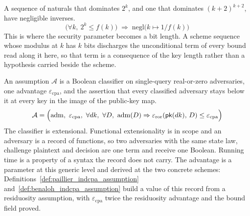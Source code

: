 \begin{lemma}
  \label{lem:negligible_fun_inv_exp2}
  \rocqok
  A sequence of naturals that dominates $2^k$, and one that dominates
  $(k+2)^{k+2}$, have negligible inverses.
  \[ \big(\forall k,\ 2^k \le f(k)\big) \;\Longrightarrow\;
     \mathrm{negl}\big(k \mapsto 1/f(k)\big) \]
  This is where the security parameter becomes a bit length. A scheme sequence
  whose modulus at $k$ has $k$ bits discharges the unconditional term of every
  bound read along it here, so that term is a consequence of the key length
  rather than a hypothesis carried beside the scheme.
\end{lemma}

\begin{definition}
  \label{def:indcpa_assumption}
  \rocqok
  An assumption $\mathcal{A}$ is a Boolean classifier on single-query
  real-or-zero adversaries, one advantage $\varepsilon_{\mathrm{cpa}}$, and the
  assertion that every classified adversary stays below it at every key in the
  image of the public-key map.
  \[ \mathcal{A} = \Big(\mathrm{adm},\ \varepsilon_{\mathrm{cpa}},\
       \forall dk,\ \forall D,\ \mathrm{adm}(D) \Rightarrow
       \epsror{\pk(dk)}{D} \le \varepsilon_{\mathrm{cpa}}\Big) \]
  The classifier is extensional. Functional extensionality is in scope and an
  adversary is a record of functions, so two adversaries with the same state
  law, challenge plaintext and decision are one term and receive one Boolean.
  Running time is a property of a syntax the record does not carry.
  The advantage is a parameter at this generic level and derived at the two
  concrete schemes: Definitions~\ref{def:paillier_indcpa_assumption}
  and~\ref{def:benaloh_indcpa_assumption} build a value of this record from a
  residuosity assumption, with $\varepsilon_{\mathrm{cpa}}$ twice the
  residuosity advantage and the bound field proved.
\end{definition}

